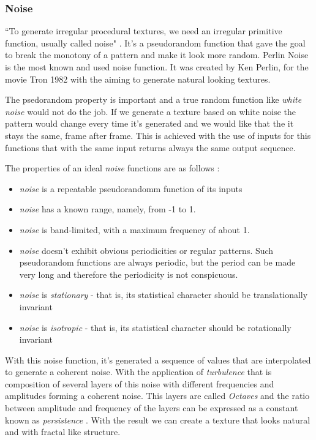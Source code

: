 
\subsubsection{Noise} %
\label{ssub:noise}


``To generate irregular procedural textures, we need an irregular primitive function, usually called noise" \cite{Ebert2002}. It's a pseudorandom function that gave the goal to break the monotony of a pattern and make it look more random.
Perlin Noise is the most known and used noise function. It was created by Ken Perlin, for the movie Tron 1982 with the aiming to generate natural looking textures.

The psedorandom property is important and a true random function like \emph{white noise} would not do the job. If we generate a texture based on white noise the pattern would change every time it's generated and we would like that the it stays the same, frame after frame. This is achieved with the use of inputs for this functions that with the same input returns always the same output sequence. 

The properties of an ideal \emph{noise} functions are as follows \cite{Ebert2002}:
\begin{itemize}
	\item \emph{noise} is a repeatable pseudorandomm function of its inputs
	\item \emph{noise} has a known range, namely, from -1 to 1.
	\item \emph{noise} is band-limited, with a maximum frequency of about 1.
	\item \emph{noise} doesn't exhibit obvious periodicities or regular patterns. Such pseudorandom functions are always periodic, but the period can be made very long and therefore the periodicity is not conspicuous.
	\item \emph{noise} is \emph{stationary} - that is, its statistical character should be translationally invariant
	\item \emph{noise} is \emph{isotropic} - that is, its statistical character should be rotationally invariant
\end{itemize}

With this noise function, it's generated a sequence of values that are interpolated to generate a coherent noise. With the application of \emph{turbulence} that is composition of several layers of this noise with different frequencies and amplitudes forming a coherent noise. This layers are called \emph{Octaves} and the ratio between amplitude and frequency of the layers can be expressed as a constant known as \emph{persistence} \cite{Kelly2008}. With the result we can create a texture that looks natural and with fractal like structure.


